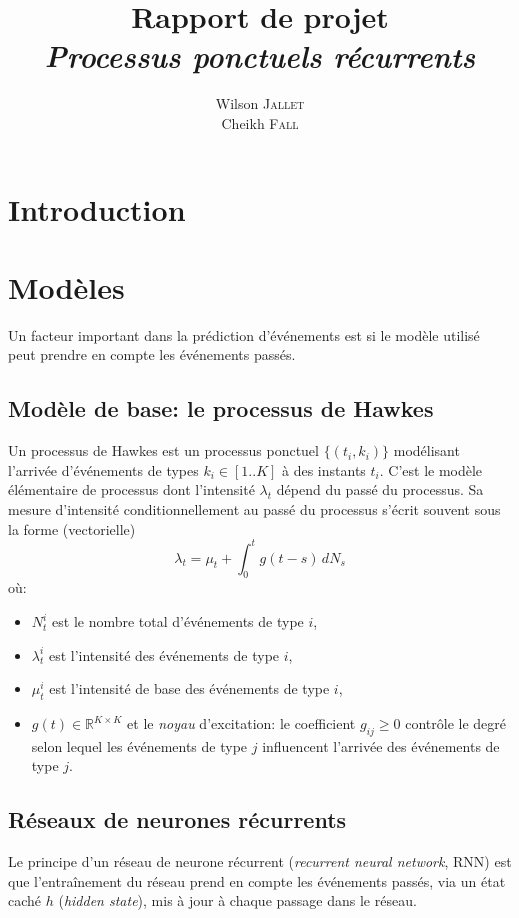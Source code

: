 \documentclass[11pt]{article}
\title{\textbf{Rapport de projet}\\
  \textit{Processus ponctuels récurrents}
}
\author{
  Wilson \textsc{Jallet}\\
  Cheikh \textsc{Fall}
}
\newcommand{\RR}{\mathbb{R}}
\begin{document}
\maketitle

\section{Introduction}


\section{Modèles}

Un facteur important dans la prédiction d'événements est si le modèle utilisé peut prendre en compte les événements passés.

\subsection{Modèle de base: le processus de Hawkes}

Un processus de Hawkes est un processus ponctuel $\{(t_i, k_i)\}$ modélisant l'arrivée d'événements de types $k_i\in[1..K]$ à des instants $t_i$. C'est le modèle élémentaire de processus dont l'intensité $\lambda_t$ dépend du passé du processus. Sa mesure d'intensité conditionnellement au passé du processus s'écrit souvent sous la forme (vectorielle)
\begin{equation}
	\lambda_t = \mu_t + \int_0^t g(t-s)\,dN_s
\end{equation}
où:\begin{itemize}
	\item $N^i_t$ est le nombre total d'événements de type $i$,
	\item $\lambda_t^i$ est l'intensité des événements de type $i$,
	\item $\mu^i_t$ est l'intensité de base des événements de type $i$,
	\item $g(t) \in \RR^{K\times K}$ et le \textit{noyau} d'excitation: le coefficient $g_{ij} \geq 0$ contrôle le degré selon lequel les événements de type $j$ influencent l'arrivée des événements de type $j$.
\end{itemize} 

\subsection{Réseaux de neurones récurrents}

Le principe d'un réseau de neurone récurrent (\textit{recurrent neural network}, RNN) est que l'entraînement du réseau prend en compte les événements passés, via un état caché $h$ (\textit{hidden state}), mis à jour à chaque passage dans le réseau.
\end{document}
